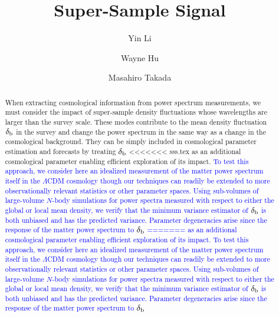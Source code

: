 \documentclass[prd,twocolumn,amsmath,amssymb,floatfix,superscriptaddress]{revtex4-1}
\newcommand{\wh}[1]{\textcolor{blue}{#1}}
\newcommand{\br}{{\rm b}}
\begin{document}
\title{Super-Sample Signal}
\author{Yin Li}
\author{Wayne Hu}
\author{Masahiro Takada}

\begin{abstract}
When extracting cosmological information from power spectrum measurements,
we must consider the impact of super-sample density fluctuations whose wavelengths are larger than the survey scale.  
These modes contribute to the mean density fluctuation $\delta_\br$  in the survey and change the power spectrum in the same way as a change in the cosmological background.  They can  be simply included
in cosmological parameter estimation 
and 
forecasts 
by treating $\delta_\br$ 
<<<<<<< sss.tex
as an additional cosmological parameter enabling efficient exploration of its impact.
\wh{To test this approach,  we consider here an idealized measurement of the matter power spectrum itself in
the $\Lambda$CDM cosmology though our 
 techniques can readily be extended to more observationally relevant statistics or
 other parameter spaces.  Using sub-volumes of large-volume
$N$-body simulations for power spectra measured with respect to either the global or local mean density, we  verify that the minimum  variance estimator of $\delta_\br$ is both unbiased and has the predicted
variance.
Parameter degeneracies arise since the response of the matter power spectrum to $\delta_\br$
=======
as an additional cosmological parameter enabling efficient exploration of its impact.
To test this approach,  we consider here an idealized measurement of the matter power spectrum itself in
the $\Lambda$CDM cosmology though our 
 techniques can readily be extended to more observationally relevant statistics or
 other parameter spaces.  Using sub-volumes of large-volume
$N$-body simulations for power spectra measured with respect to either the global or local mean density, we  verify that the minimum  variance estimator of $\delta_\br$ is both unbiased and has the predicted
variance.
Parameter degeneracies arise since the response of the matter power spectrum to $\delta_\br$
}
\end{abstract}
\end{document}
